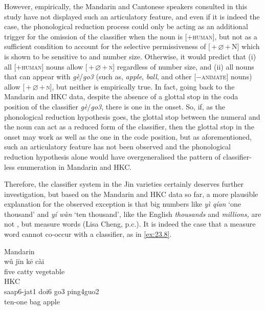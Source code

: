 \documentclass[output=paper]{langsci/langscibook}
\begin{document}
However, empirically, the Mandarin and Cantonese
speakers consulted in this study have not displayed such an articulatory
feature, and even if it is indeed the case, the phonological reduction process
could only be acting as an additional trigger for the omission of the
classifier when the noun is [$+$\textsc{human}], but not as a sufficient
condition to account for the selective permissiveness of
[\Num{}\,$+$\,$\varnothing$\,$+$\,N] which is shown to be sensitive to
 and number size. Otherwise, it would predict that (i) all
[$+$\textsc{human}] nouns allow [\Num{}\,$+$\,$\varnothing$\,$+$\,\textsc{n}]
regardless of number size, and (ii) all nouns that can appear with
\emph{gè}/\emph{go3} (such as, \emph{apple}, \emph{ball}, and other
[$-$\textsc{animate}] nouns) allow [\Num{}\,$+$\,$\varnothing$\,$+$\,\textsc{n}],
but neither is empirically true. In fact, going back to the Mandarin and
\gls{HKC} data, despite the absence of a glottal stop in the coda position of
the classifier \emph{gè}/\emph{go3}, there is one in the onset. So, if, as the
phonological reduction hypothesis goes, the glottal stop between the numeral
and the noun can act as a reduced form of the classifier, then the glottal stop
in the onset may work as well as the one in the code position, but as
aforementioned, such an articulatory feature has not been observed and the
phonological reduction hypothesis alone would have overgeneralised the pattern
of classifier-less enumeration in Mandarin and \gls{HKC}.

Therefore, the classifier system in the Jin varieties certainly deserves
further investigation, but based on the Mandarin and \gls{HKC} data so far, a
more plausible explanation for the observed exception is that big numbers like
\emph{yì qían} ‘one thousand’ and \emph{yí wàn} ‘ten thousand’, like the
English \emph{thousands} and \emph{millions,} are not , but
measure words (Lisa Cheng, p.c.). It is indeed the case that a measure word
cannot co-occur with a classifier, as in \eqref{ex:23.8}.

\ea\label{ex:23.8} %
	\ea Mandarin\\
    \gll * wǔ jīn kē cài\\
		{} five catty \Clf{} vegetable\\
    \ex \gls{HKC}\\%
	\gll * saap6-jat1 doi6 go3 ping4guo2\\
		{} ten-one bag \Clf{} apple\\
	\z
\z
\end{document}
